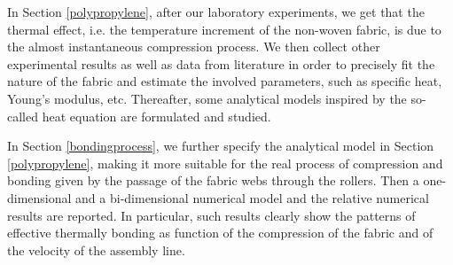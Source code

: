 \par
In Section \ref{polypropylene}, after our laboratory experiments, we get that the thermal effect, i.e. the temperature increment of the non-woven fabric, is due to the almost instantaneous compression process. We then collect other experimental results as well as data from literature in order to precisely fit the nature of the fabric and estimate the involved parameters, such as specific heat, Young's modulus, etc. Thereafter, some analytical models inspired by the so-called heat equation are formulated and studied.
\par
In Section \ref{bondingprocess}, we further specify the analytical model in Section \ref{polypropylene}, making it more suitable for the real process of compression and bonding given by the passage of the fabric webs through the rollers. Then a one-dimensional and a bi-dimensional numerical model and the relative numerical results are reported. In particular, such results clearly show the patterns of effective thermally bonding as function of the compression of the fabric and of the velocity of the assembly line.
\par
